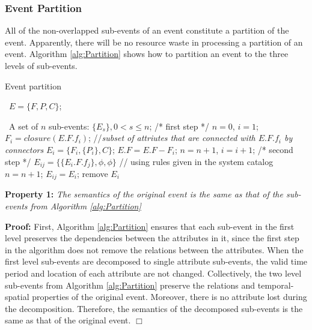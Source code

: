 \documentclass[12pt,journal,draftcls,letterpaper,onecolumn]{elsarticle}
\newcommand{\algorithmicinput}{\textbf{Input}}
\newcommand{\algorithmicoutput}{\textbf{Output}}
\newcommand{\INPUT}{\item[{\algorithmicinput}]$\phantom{1}$}
\newcommand{\OUTPUT}{\item[\algorithmicoutput]$\phantom{1}$}
\begin{document}
\subsubsection{Event Partition}

All of the non-overlapped sub-events of an event constitute a
partition of the event. Apparently, there will be no resource waste
in processing a partition of an event. Algorithm \ref{alg:Partition}
shows how to partition an event to the three levels of sub-events.

\begin{algorithm} [ht]
\caption{Event partition} \label{alg:Partition}
\begin{algorithmic}
\INPUT $E = \{F, P, C\}$;
\OUTPUT A set of $n$ sub-events: $\{E_s\}, 0 < s \leq n$; \STATE /*
first step */ \STATE $n = 0$, $i = 1$; 
    \STATE $F_i = closure(E.F.f_i)$; //\emph{subset of attriutes that are connected with $E.F.f_i$ by connectors}
    \STATE $E_i = \{F_i, \{P_i\}, C\}$;
    \STATE $E.F = E.F - F_i$;
    \STATE $n = n + 1$, $i = i + 1$;
\ENDWHILE \STATE /* second step */
           \STATE $E_{ij} = \{\{E_i.F.f_j\}, \phi, \phi \}$ // using rules given in the system catalog
           \STATE $n = n + 1$;
       \ELSE
           \STATE $E_{ij} = E_i $;
           \STATE remove $E_i$
       \ENDIF
   \ENDFOR
\ENDFOR

\end{algorithmic}
\end{algorithm}

\textbf{Property 1:} \emph{The semantics of the original event is
the same as that of the sub-events from Algorithm
\ref{alg:Partition} }

\textbf{Proof:} First,  Algorithm \ref{alg:Partition} ensures that
each sub-event in the first level preserves the dependencies between
the attributes in it, since the first step in the algorithm does not
remove the relations between the attributes. When the first level
sub-events are decomposed to single attribute sub-events, the valid
time period and location of each attribute are not changed.
Collectively, the two level sub-events from Algorithm
\ref{alg:Partition} preserve the relations and temporal-spatial
properties of the original event. Moreover, there is no attribute
lost during the decomposition. Therefore, the semantics of the
decomposed sub-events is the same as that of the original event.
$\Box$
\end{document}
